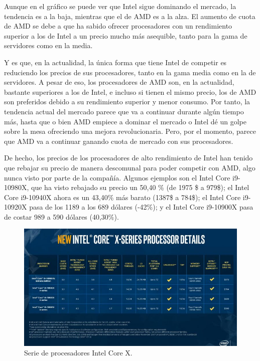 \documentclass[11pt,a4paper]{article}
\begin{document}
Aunque en el gráfico se puede ver que Intel sigue dominando el mercado, la tendencia es a la baja,
mientras que el de AMD es a la alza. El aumento de cuota de AMD se debe a que ha sabido ofrecer
procesadores con un rendimiento superior a los de Intel a un precio mucho más asequible, tanto
para la gama de servidores como en la media.

Y es que, en la actualidad, la única forma que tiene Intel de competir es reduciendo los precios
de sus procesadores, tanto en la gama media como en la de servidores. A pesar de eso, los
procesadores de AMD son, en la actualidad, bastante superiores a los de Intel, e incluso si tienen
el mismo precio, los de AMD son preferidos debido a su rendimiento superior y menor consumo. Por
tanto, la tendencia actual del mercado parece que va a continuar durante algún tiempo más, hasta
que o bien AMD empiece a dominar el mercado o Intel dé un golpe sobre la mesa ofreciendo una
mejora revolucionaria. Pero, por el momento, parece que AMD va a continuar ganando cuota de
mercado con sus procesadores.

De hecho, los precios de los procesadores de alto rendimiento de Intel han tenido que rebajar su
precio de manera descomunal para poder competir con AMD, algo nunca visto por parte de la
compañía. Algunos ejemplos son el Intel Core i9-10980X, que ha visto rebajado su precio un 50,40
\% (de 1975 \$ a 979\$); el Intel Core i9-10940X ahora es un 43,40\% más barato (1387\$ a 784\$);
el Intel Core i9-10920X pasa de los 1189 a los 689 dólares (-42\%); y el Intel Core i9-10900X pasa
de costar 989 a 590 dólares (40,30\%).

\begin{figure}[H]
  \centering
  \includegraphics[scale=0.5]{img/procesadores-intel}
  \caption{Serie de procesadores Intel Core X.}
\end{figure}
\end{document}
